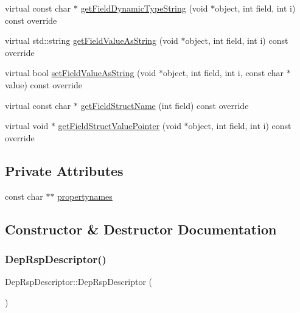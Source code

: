 \begin{DoxyCompactItemize}
\item 
virtual const char $\ast$ \hyperlink{class_dep_rsp_descriptor_ad838a8750347f561ed11e90b256aeb22}{get\+Field\+Dynamic\+Type\+String} (void $\ast$object, int field, int i) const override
\item 
virtual std\+::string \hyperlink{class_dep_rsp_descriptor_a026817a85cc05c7437c2a268a1829904}{get\+Field\+Value\+As\+String} (void $\ast$object, int field, int i) const override
\item 
virtual bool \hyperlink{class_dep_rsp_descriptor_a3414d7eb627262e4a5a99c30c1576f8f}{set\+Field\+Value\+As\+String} (void $\ast$object, int field, int i, const char $\ast$value) const override
\item 
virtual const char $\ast$ \hyperlink{class_dep_rsp_descriptor_a0cd988268afab355cb362d4b00e85a33}{get\+Field\+Struct\+Name} (int field) const override
\item 
virtual void $\ast$ \hyperlink{class_dep_rsp_descriptor_a08b3228538e6111c6f337ead9abbf557}{get\+Field\+Struct\+Value\+Pointer} (void $\ast$object, int field, int i) const override
\end{DoxyCompactItemize}
\subsection*{Private Attributes}
\begin{DoxyCompactItemize}
\item 
const char $\ast$$\ast$ \hyperlink{class_dep_rsp_descriptor_a496616950826cf009074023668b335de}{propertynames}
\end{DoxyCompactItemize}


\subsection{Constructor \& Destructor Documentation}
\mbox{\label{class_dep_rsp_descriptor_ad256a6a63460351ea6a372618915c2d8}} 
\subsubsection{\texorpdfstring{Dep\+Rsp\+Descriptor()}{DepRspDescriptor()}}
{\footnotesize\ttfamily Dep\+Rsp\+Descriptor\+::\+Dep\+Rsp\+Descriptor (\begin{DoxyParamCaption}{ }\end{DoxyParamCaption})}

